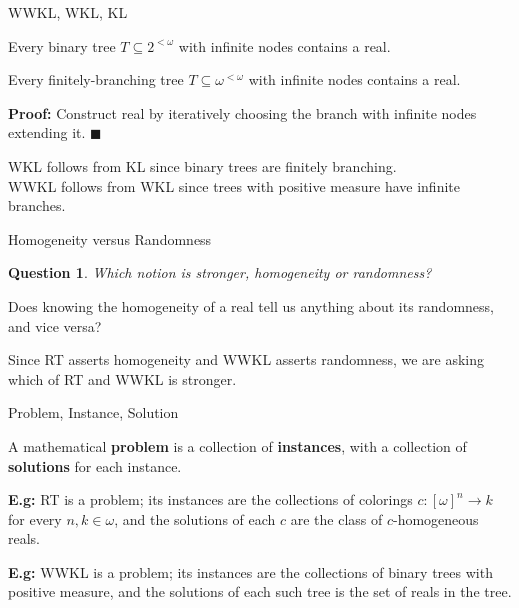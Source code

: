 \begin{frame}{WWKL, WKL, KL}
  \begin{thm*}
    Every binary tree $T\subseteq2^{<\omega}$ with infinite nodes contains
    a real.
  \end{thm*}

  \begin{thm*}
    Every finitely-branching tree $T\subseteq\omega^{<\omega}$ with
    infinite nodes contains a real.
  \end{thm*}
  \textbf{Proof:} Construct real by iteratively choosing the branch with
  infinite nodes extending it. $\blacksquare$

  \vspace{2em}
  WKL follows from KL since binary trees are finitely branching.\\
  \vspace{1em}
  WWKL follows from WKL since trees with positive measure have infinite
  branches.
\end{frame}

\begin{frame}{Homogeneity versus Randomness}
  \newtheorem*{question*}{Question}
  \begin{question*}
    Which notion is stronger, homogeneity or randomness?
  \end{question*}

  \vspace{2em}
  Does knowing the homogeneity of a real tell us anything about its
  randomness, and vice versa?

  \vspace{2em}
  Since RT asserts homogeneity and WWKL asserts randomness, we are asking
  which of RT and WWKL is stronger.
\end{frame}

\begin{frame}{Problem, Instance, Solution}
  \begin{define*}
    A mathematical \textbf{problem} is a collection of \textbf{instances},
    with a collection of \textbf{solutions} for each instance.
  \end{define*}

  \vspace{2em}
  \textbf{E.g:} RT is a problem; its instances are the collections of
  colorings $c:[\omega]^n\rightarrow k$ for every $n,k\in\omega$, and the
  solutions of each $c$ are the class of $c$-homogeneous reals.

  \vspace{2em}
  \textbf{E.g:} WWKL is a problem; its instances are the collections of
  binary trees with positive measure, and the solutions of each such tree
  is the set of reals in the tree.
\end{frame}


